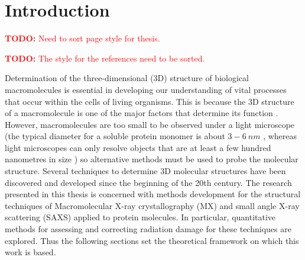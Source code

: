 \chapter{Introduction}
\label{chap:Introduction - Intro chapter}
\textcolor{red}{
\begin{myenumerate}
    \item \hypertarget{todo:SortPageStyle}{\textbf{TODO:} Need to sort page style for thesis.}
    \item \hypertarget{todo:SortReferenceStyle}{\textbf{TODO:} The style for the references need to be sorted.}
\end{myenumerate}
}
Determination of the three-dimensional (3D) structure of biological macromolecules is essential in developing our understanding of vital processes that occur within the cells of living organisms.
This is because the 3D structure of a macromolecule is one of the major factors that determine its function \cite[s~3.6]{berg2002,hegyi1999}.
However, macromolecules are too small to be observed under a light microscope (the typical diameter for a soluble protein monomer is about $3-6\ nm$ \cite{Philips2015}, whereas light microscopes can only resolve objects that are at least a few hundred nanometres in size \cite[p~54]{starr2010}) so alternative methods must be used to probe the molecular structure.
Several techniques to determine 3D molecular structures have been discovered and developed since the beginning of the 20th century.
The research presented in this thesis is concerned with methods development for the structural techniques of Macromolecular X-ray crystallography (MX) and small angle X-ray scattering (SAXS) applied to protein molecules.
In particular, quantitative methods for assessing and correcting radiation damage for these techniques are explored.
Thus the following sections set the theoretical framework on which this work is based.
